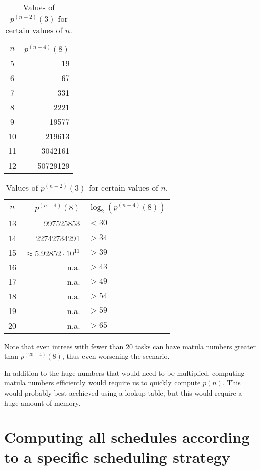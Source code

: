 \begin{description}
\begin{table}[th]
  \centering
  \begin{tabular}[ht]{cr}
    $n$ & $p^{(n-4)}(8)$ \\
    \hline
    5 & 19 \\
    6 & 67 \\
    7 & 331 \\
    8 & 2221 \\
    9 & 19577 \\
    10 & 219613 \\
    11 & 3042161 \\
    12 & 50729129 \\
  \end{tabular}
  \quad
  \begin{tabular}[ht]{crl}
    $n$ & $p^{(n-4)}(8)$ & $\log_2\left( p^{(n-4)}(8) \right)$ \\
    \hline13 & 997525853 & $<30$\\
    14 & 22742734291 & $>34$ \\
    15 & $\approx 5.92852 \cdot 10^{11}$ & $> 39$ \\
    16 & n.a. & $> 43$ \\
    17 & n.a. & $> 49$ \\
    18 & n.a. & $> 54$ \\
    19 & n.a. & $> 59$ \\
    20 & n.a. & $> 65$ \\
  \end{tabular}
  \caption{Values of $p^{(n-2)}(3)$ for certain values of $n$.}
  \label{tab:certain-values-pn-2-3-growth}
\end{table}

Note that even intrees with fewer than 20 tasks can have matula numbers greater than $p^{(20-4)}(8)$, thus even worsening the scenario. 

In addition to the huge numbers that would need to be multiplied, computing matula numbers efficiently would require us to quickly compute $p(n)$. This would probably best acchieved using a lookup table, but this would require a huge amount of memory.

\end{description}

\section{Computing all schedules according to a specific scheduling strategy}
\label{sec:implementation-computing-all-schedules}

